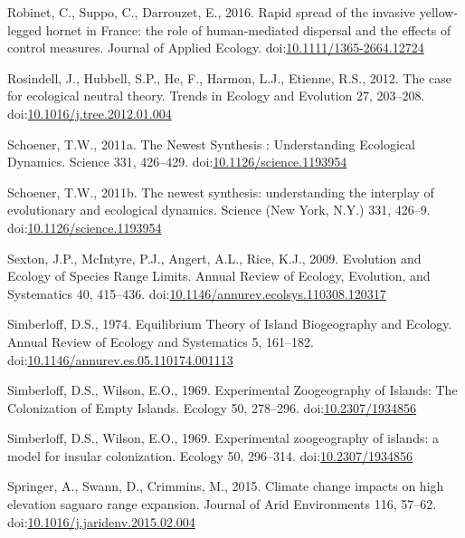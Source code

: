 \hypertarget{ref-Robinet2016}{}
Robinet, C., Suppo, C., Darrouzet, E., 2016. Rapid spread of the
invasive yellow-legged hornet in France: the role of human-mediated
dispersal and the effects of control measures. Journal of Applied
Ecology.
doi:\href{https://doi.org/10.1111/1365-2664.12724}{10.1111/1365-2664.12724}

\hypertarget{ref-Rosindell2012}{}
Rosindell, J., Hubbell, S.P., He, F., Harmon, L.J., Etienne, R.S., 2012.
The case for ecological neutral theory. Trends in Ecology and Evolution
27, 203--208.
doi:\href{https://doi.org/10.1016/j.tree.2012.01.004}{10.1016/j.tree.2012.01.004}

\hypertarget{ref-Schoener2011a}{}
Schoener, T.W., 2011a. The Newest Synthesis : Understanding Ecological
Dynamics. Science 331, 426--429.
doi:\href{https://doi.org/10.1126/science.1193954}{10.1126/science.1193954}

\hypertarget{ref-Schoener2011}{}
Schoener, T.W., 2011b. The newest synthesis: understanding the interplay
of evolutionary and ecological dynamics. Science (New York, N.Y.) 331,
426--9.
doi:\href{https://doi.org/10.1126/science.1193954}{10.1126/science.1193954}

\hypertarget{ref-Sexton2009}{}
Sexton, J.P., McIntyre, P.J., Angert, A.L., Rice, K.J., 2009. Evolution
and Ecology of Species Range Limits. Annual Review of Ecology,
Evolution, and Systematics 40, 415--436.
doi:\href{https://doi.org/10.1146/annurev.ecolsys.110308.120317}{10.1146/annurev.ecolsys.110308.120317}

\hypertarget{ref-Simberloff1974a}{}
Simberloff, D.S., 1974. Equilibrium Theory of Island Biogeography and
Ecology. Annual Review of Ecology and Systematics 5, 161--182.
doi:\href{https://doi.org/10.1146/annurev.es.05.110174.001113}{10.1146/annurev.es.05.110174.001113}

\hypertarget{ref-Simberloff1969}{}
Simberloff, D.S., Wilson, E.O., 1969. Experimental Zoogeography of
Islands: The Colonization of Empty Islands. Ecology 50, 278--296.
doi:\href{https://doi.org/10.2307/1934856}{10.2307/1934856}

\hypertarget{ref-Simberloff1969a}{}
Simberloff, D.S., Wilson, E.O., 1969. Experimental zoogeography of
islands: a model for insular colonization. Ecology 50, 296--314.
doi:\href{https://doi.org/10.2307/1934856}{10.2307/1934856}

\hypertarget{ref-Springer2015}{}
Springer, A., Swann, D., Crimmins, M., 2015. Climate change impacts on
high elevation saguaro range expansion. Journal of Arid Environments
116, 57--62.
doi:\href{https://doi.org/10.1016/j.jaridenv.2015.02.004}{10.1016/j.jaridenv.2015.02.004}

